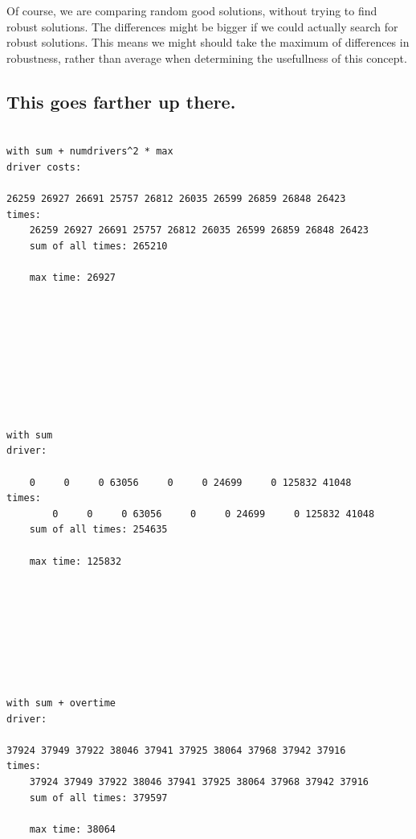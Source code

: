 \documentclass{article}
\begin{document}
Of course, we are comparing random good solutions, without trying to find robust solutions.
The differences might be bigger if we could actually search for robust solutions.
This means we might should take the maximum of differences in robustness, rather than average when determining the usefullness of this concept.


\subsection{This goes farther up there.}


\begin{verbatim}

with sum + numdrivers^2 * max
driver costs: 
	
26259 26927 26691 25757 26812 26035 26599 26859 26848 26423 
times: 
	26259 26927 26691 25757 26812 26035 26599 26859 26848 26423 
	sum of all times: 265210

	max time: 26927
	
	
	
	
	
	
	
	
	
with sum
driver: 
	
    0     0     0 63056     0     0 24699     0 125832 41048 
times: 
	    0     0     0 63056     0     0 24699     0 125832 41048 
	sum of all times: 254635

	max time: 125832
	

	
	
	
	
	
	
with sum + overtime
driver: 
	
37924 37949 37922 38046 37941 37925 38064 37968 37942 37916 
times: 
	37924 37949 37922 38046 37941 37925 38064 37968 37942 37916 
	sum of all times: 379597

	max time: 38064

\end{verbatim}
\end{document}
